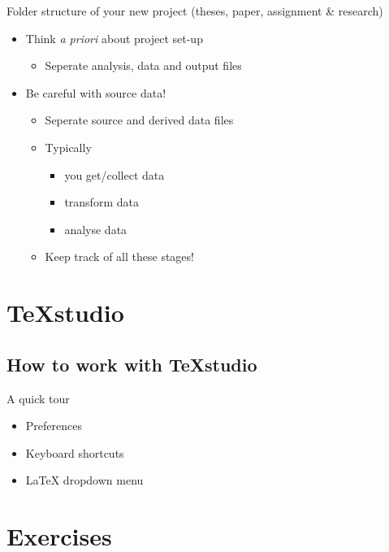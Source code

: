 \documentclass[ignorenonframetext]{beamer}
\begin{document}
{\begin{frame}{Folder structure of your new project (theses, paper, assignment \& research)}

\begin{itemize}
\item
  Think \emph{a priori} about project set-up

  \begin{itemize}
  \item
    Seperate analysis, data and output files
  \end{itemize}
\item
  Be careful with source data!

  \begin{itemize}
  \item
    Seperate source and derived data files
  \item
    Typically

    \begin{itemize}
    \item
      you get/collect data
    \item
      transform data
    \item
      analyse data
    \end{itemize}
  \item
    Keep track of all these stages!
  \end{itemize}
\end{itemize}
\end{frame}


\section{TeXstudio}

\subsection{How to work with TeXstudio}

\begin{frame}{A quick tour}
	\begin{itemize}
		\item Preferences
		\newline
		\item Keyboard shortcuts
		\newline
		\item LaTeX dropdown menu
	\end{itemize}
\end{frame}

\section{Exercises}

}
\end{document}
